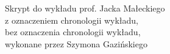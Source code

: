 \begin{titlepage}
  \thispagestyle{empty}
  \null
\end{titlepage}

\begin{titlepage}
  \thispagestyle{empty}
  \centering
  \vspace*{\fill}
  \begin{minipage}{\textwidth}
    \centering
    \fontsize{17}{25}\selectfont
    Skrypt do wykładu prof. Jacka Małeckiego\\
    \ifchronologia
      z oznaczeniem chronologii wykładu,\\
    \else
      bez oznaczenia chronologii wykładu,\\
    \fi
    wykonane przez Szymona Gazińskiego
  \end{minipage}
  \vspace*{\fill}
\end{titlepage}
